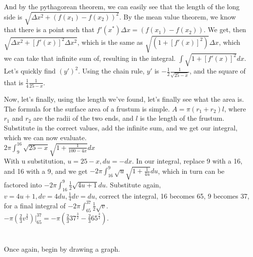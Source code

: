 \documentclass[10pt]{article}
\begin{document}
And by the pythagorean theorem, we can easily see that the length of the long side is \(\sqrt{\Delta x^2+(f(x_1)-f(x_2))^2}\). By the mean value theorem, we know that there is a point such that \(f'(x^{*}) \Delta x = (f(x_1)-f(x_2))\). We get, then \(\sqrt{\Delta x^2+[f'(x)]^2\Delta x^2}\), which is the same as \(\sqrt{(1+[f'(x)]^2)}\Delta x\), which we can take that infinite sum of, resulting in the integral. \(\int\sqrt{1+[f'(x)]^2}dx\).\\
Let's quickly find \((y')^2\). Using the chain rule, \(y'\) is \(-\frac{1}{2}\frac{1}{\sqrt{25-x}}\), and the square of that is \(\frac{1}{4}\frac{1}{25-x}\).

Now, let's finally, using the length we've found, let's finally see what the area is. The formula for the surface area of a frustum is simple. \(A=\pi(r_1+r_2)l\), where \(r_1\) and \(r_2\) are the radii of the two ends, and \(l\) is the length of the frustum. Substitute in the correct values, add the infinite sum, and we get our integral, which we can now evaluate.\\
\(2\pi\int_9^{16}\sqrt{25-x}\sqrt{1+\frac{1}{100-4x}}dx\)\\
With u substitution, \(u=25-x, du=-dx\). In our integral, replace 9 with a 16, and 16 with a 9, and we get \(-2\pi\int_{16}^9\sqrt{u}\sqrt{1+\frac{1}{4u}}du\), which in turn can be factored into \(-2\pi\int_{16}^9\frac{1}{2}\sqrt{4u+1}du\). Substitute again, \(v=4u+1, dv=4du, \frac{1}{4}dv=du\), correct the integral, 16 becomes 65, 9 becomes 37, for a final integral of \(-2\pi\int_{65}^{37}\frac{1}{2}\sqrt{v}\).\\

\(-\pi(\frac{2}{3}v^{\frac{3}{2}})|_{65}^{37}=-\pi(\frac{2}{3}37^{\frac{3}{2}}-\frac{2}{3}65^{\frac{3}{2}})\).

\section{}
Once again, begin by drawing a graph.\\ 
\end{document}
